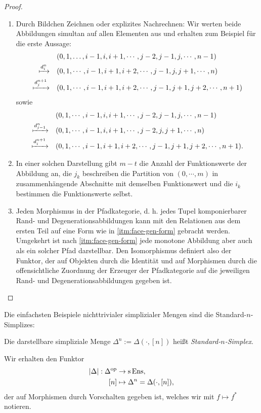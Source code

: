 \begin{proof}
  \begin{enumerate}[label=(\roman*)]
  \item Durch Bildchen Zeichnen oder explizites Nachrechnen: Wir
  werten beide Abbildungen simultan auf allen Elementen aus und
  erhalten zum Beispiel für die erste Aussage:
  \begin{align*}
  &(0, 1, \dots, i-1, i, i+1, \cdots, j-2, j-1, j, \cdots, n-1) \\
  \xmapsto{d_i^n} \quad
  &(0, 1, \cdots, i-1, i+1, i+2, \cdots, j-1, j, j+1, \cdots, n) \\
  \xmapsto{d_j^{n+1}} \quad
  &(0, 1, \cdots, i-1, i+1, i+2, \cdots, j-1, j+1, j+2, \cdots, n+1)
  \end{align*}
  sowie
  \begin{align*}
  &(0, 1, \cdots, i-1, i, i+1, \cdots, j-2, j-1, j, \cdots, n-1) \\
  \xmapsto{d_{j-1}^n} \quad
  &(0, 1, \cdots, i-1, i, i+1, \cdots, j-2, j, j+1, \cdots, n) \\
  \xmapsto{d_i^{n+1}} \quad
  &(0, 1, \cdots, i-1, i+1, i+2, \cdots, j-1, j+1, j+2, \cdots, n+1).
  \end{align*}

  \item In einer solchen Darstellung gibt $m - t$ die Anzahl der
  Funktionswerte der Abbildung an, die $j_k$ beschreiben die Partition
  von $(0, \cdots, m)$ in zusammenhängende Abschnitte mit demselben
  Funktionswert und die $i_k$ bestimmen die Funktionswerte selbst.

  \item Jeden Morphismus in der Pfadkategorie, d. h. jedes Tupel
  komponierbarer Rand- und Degenerationsabbildungen kann mit den
  Relationen aus dem ersten Teil auf eine Form wie
  in \ref{itm:face-gen-form} gebracht werden. Umgekehrt ist
  nach \ref{itm:face-gen-form} jede monotone Abbildung aber auch als
  ein solcher Pfad darstellbar. Den Isomorphismus definiert also der
  Funktor, der auf Objekten durch die Identität und auf Morphismen
  durch die offensichtliche Zuordnung der Erzeuger der Pfadkategorie
  auf die jeweiligen Rand- und Degenerationsabbildungen gegeben ist.
\end{enumerate}
\end{proof}

Die einfachsten Beispiele nichttrivialer simplizialer Mengen sind die
Standard-$n$-Simplizes:
\begin{defn} \label{def:comb-standard-simplex}
  Die darstellbare simpliziale Menge $\Delta^n := \Delta(\cdot, [n])$
  heißt \emph{Standard-$n$-Simplex}.
\end{defn}
Wir erhalten den Funktor
\begin{align*}
  |\Delta|: \Delta^\mathrm{op} &\to \operatorname{s}\operatorname{Ens}, \\
  [n] &\mapsto \Delta^n = \Delta(\cdot, [n]),
\end{align*}
der auf Morphismen durch Vorschalten gegeben ist, welches wir mit
$f \mapsto f^*$ notieren.

